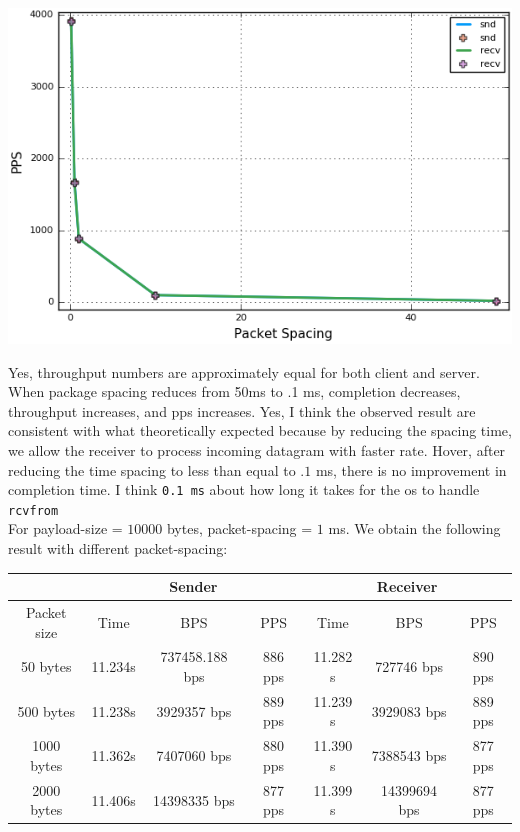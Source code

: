 \documentclass[12pt]{article}
\newenvironment{problem}[2][Problem]{\begin{trivlist}
\item[\hskip \labelsep {\bfseries #1}\hskip \labelsep {\bfseries #2.}]}{\end{trivlist}}
\begin{document}
\begin{problem}{2}
\begin{center}
\includegraphics[scale=.6]{5.png}	
\end{center}
Yes, throughput numbers are approximately equal for both client and server. When package spacing reduces from 50ms to .1 ms, completion decreases, throughput increases, and pps increases. Yes, I think the observed result are consistent with what theoretically expected because by reducing the spacing time, we allow the receiver to process incoming datagram with faster rate. Hover, after reducing the time spacing to less than equal to $.1$ ms, there is no improvement in completion time. I think \texttt{0.1 ms} about how long it takes for the os to handle \texttt{rcvfrom}\\
For payload-size = $10000$ bytes, packet-spacing = $1$ ms. We obtain the following result with different packet-spacing:\\
\begin{center}
	\begin{tabular}{|c|c|c|c|c|c|c|}
	\hline 
	& \multicolumn{3}{|c|}{Sender} & \multicolumn{3}{|c|}{Receiver}\\ \hline
	Packet size 		   	   & Time& BPS& PPS& Time &BPS& PPS\\ \hline
	50 bytes 		  		   & 11.234s &  737458.188 bps& 886 pps & 11.282 s &727746 bps& 890 pps\\ \hline
	500 bytes 		  		   & 11.238s &  3929357 bps& 889 pps & 11.239 s & 3929083 bps & 889 pps\\ \hline
	1000 bytes 		  		   & 11.362s &  7407060 bps& 880 pps & 11.390 s &7388543 bps  & 877 pps\\ \hline
	2000 bytes 		  		   & 11.406s &  14398335 bps& 877 pps & 11.399 s &14399694 bps& 877 pps\\ \hline

\end{tabular}
\end{center}
\end{problem}
\end{document}
